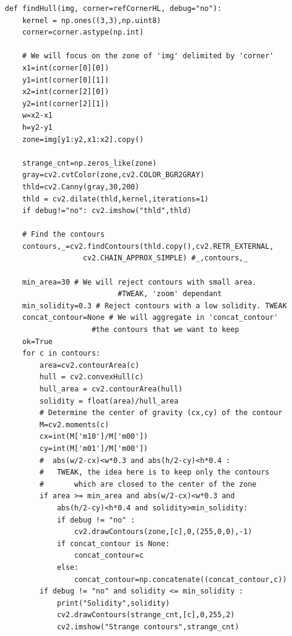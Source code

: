 \documentclass[12pt, а4paper]{article}
\begin{document}
\begin{verbatim}
def findHull(img, corner=refCornerHL, debug="no"):
    kernel = np.ones((3,3),np.uint8)
    corner=corner.astype(np.int)

    # We will focus on the zone of 'img' delimited by 'corner'
    x1=int(corner[0][0])
    y1=int(corner[0][1])
    x2=int(corner[2][0])
    y2=int(corner[2][1])
    w=x2-x1
    h=y2-y1
    zone=img[y1:y2,x1:x2].copy()

    strange_cnt=np.zeros_like(zone)
    gray=cv2.cvtColor(zone,cv2.COLOR_BGR2GRAY)
    thld=cv2.Canny(gray,30,200)
    thld = cv2.dilate(thld,kernel,iterations=1)
    if debug!="no": cv2.imshow("thld",thld)
    
    # Find the contours
    contours,_=cv2.findContours(thld.copy(),cv2.RETR_EXTERNAL,
				  cv2.CHAIN_APPROX_SIMPLE) #_,contours,_

    min_area=30 # We will reject contours with small area.
					      #TWEAK, 'zoom' dependant
    min_solidity=0.3 # Reject contours with a low solidity. TWEAK
    concat_contour=None # We will aggregate in 'concat_contour'
				    #the contours that we want to keep    
    ok=True
    for c in contours:
        area=cv2.contourArea(c)
        hull = cv2.convexHull(c)
        hull_area = cv2.contourArea(hull)
        solidity = float(area)/hull_area
        # Determine the center of gravity (cx,cy) of the contour
        M=cv2.moments(c)
        cx=int(M['m10']/M['m00'])
        cy=int(M['m01']/M['m00'])
        #  abs(w/2-cx)<w*0.3 and abs(h/2-cy)<h*0.4 :
        #	TWEAK, the idea here is to keep only the contours
        #		which are closed to the center of the zone
        if area >= min_area and abs(w/2-cx)<w*0.3 and
			abs(h/2-cy)<h*0.4 and solidity>min_solidity:
            if debug != "no" :
                cv2.drawContours(zone,[c],0,(255,0,0),-1)
            if concat_contour is None:
                concat_contour=c
            else:
                concat_contour=np.concatenate((concat_contour,c))
        if debug != "no" and solidity <= min_solidity :
            print("Solidity",solidity)
            cv2.drawContours(strange_cnt,[c],0,255,2)
            cv2.imshow("Strange contours",strange_cnt)
            

\end{verbatim}
\end{document}

